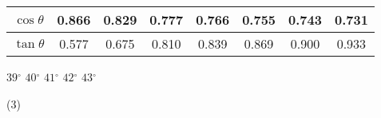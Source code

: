 \begin{QUESTIONS}
\begin{QUESTION}
\begin{QBODY}
\begin{tabular}{|c|c|c|c|c|c|c|c|}
			$\cos \theta $	& 0.866	        &    0.829	    &       0.777	    &     0.766	       &   0.755	   &       0.743	&      0.731     \\\hline
			$\tan \theta $	& 0.577	        &    0.675	    &       0.810	    &     0.839	       &   0.869	   &       0.900	&      0.933     \\\hline
			\end{tabular}
			\begin{QOPS}
				\QOP $39{}^\circ $
				\QOP $40{}^\circ $
				\QOP $41{}^\circ $
				\QOP $42{}^\circ $
				\QOP $43{}^\circ $
			\end{QOPS}
        \end{QBODY}
        \begin{QFROMS}
        \end{QFROMS}
        \begin{QTAGS}\end{QTAGS}
        \begin{QANS}
            (3)
        \end{QANS}
        \begin{QSOLLIST}
        \end{QSOLLIST}
        \begin{QEMPTYSPACE}
        \end{QEMPTYSPACE}
    \end{QUESTION}
\end{QUESTIONS}

